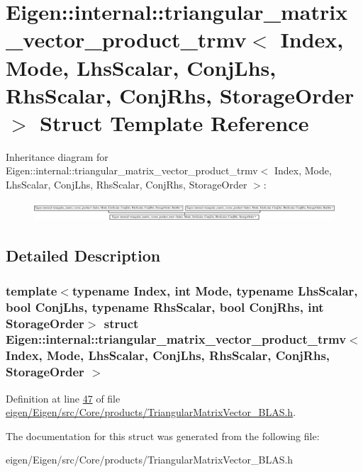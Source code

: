 \hypertarget{struct_eigen_1_1internal_1_1triangular__matrix__vector__product__trmv}{}\section{Eigen\+:\+:internal\+:\+:triangular\+\_\+matrix\+\_\+vector\+\_\+product\+\_\+trmv$<$ Index, Mode, Lhs\+Scalar, Conj\+Lhs, Rhs\+Scalar, Conj\+Rhs, Storage\+Order $>$ Struct Template Reference}
\label{struct_eigen_1_1internal_1_1triangular__matrix__vector__product__trmv}
Inheritance diagram for Eigen\+:\+:internal\+:\+:triangular\+\_\+matrix\+\_\+vector\+\_\+product\+\_\+trmv$<$ Index, Mode, Lhs\+Scalar, Conj\+Lhs, Rhs\+Scalar, Conj\+Rhs, Storage\+Order $>$\+:\begin{figure}[H]
\begin{center}
\leavevmode
\includegraphics[height=0.734908cm]{struct_eigen_1_1internal_1_1triangular__matrix__vector__product__trmv}
\end{center}
\end{figure}


\subsection{Detailed Description}
\subsubsection*{template$<$typename Index, int Mode, typename Lhs\+Scalar, bool Conj\+Lhs, typename Rhs\+Scalar, bool Conj\+Rhs, int Storage\+Order$>$\newline
struct Eigen\+::internal\+::triangular\+\_\+matrix\+\_\+vector\+\_\+product\+\_\+trmv$<$ Index, Mode, Lhs\+Scalar, Conj\+Lhs, Rhs\+Scalar, Conj\+Rhs, Storage\+Order $>$}



Definition at line \hyperlink{eigen_2_eigen_2src_2_core_2products_2_triangular_matrix_vector___b_l_a_s_8h_source_l00047}{47} of file \hyperlink{eigen_2_eigen_2src_2_core_2products_2_triangular_matrix_vector___b_l_a_s_8h_source}{eigen/\+Eigen/src/\+Core/products/\+Triangular\+Matrix\+Vector\+\_\+\+B\+L\+A\+S.\+h}.



The documentation for this struct was generated from the following file\+:\begin{DoxyCompactItemize}
\item 
eigen/\+Eigen/src/\+Core/products/\+Triangular\+Matrix\+Vector\+\_\+\+B\+L\+A\+S.\+h\end{DoxyCompactItemize}
